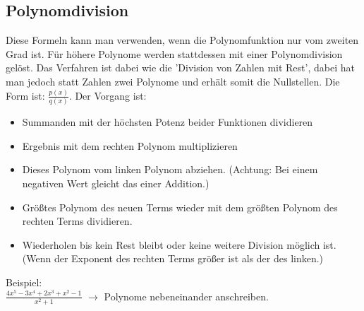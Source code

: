 \documentclass{article}
\begin{document}
	\subsection{Polynomdivision}
	Diese Formeln kann man verwenden, wenn die Polynomfunktion nur vom zweiten Grad ist. Für höhere Polynome werden stattdessen mit einer Polynomdivision gelöst. Das Verfahren ist dabei wie die 'Division von Zahlen mit Rest', dabei hat man jedoch statt Zahlen zwei Polynome und erhält somit die Nullstellen. Die Form ist: $\frac{p(x)}{q(x)}$. Der Vorgang ist:
	\begin{itemize}
		\item{Summanden mit der höchsten Potenz beider Funktionen dividieren}
		\item{Ergebnis mit dem rechten Polynom multiplizieren}
		\item{Dieses Polynom vom linken Polynom abziehen. (Achtung: Bei einem negativen Wert gleicht das einer Addition.)}
		\item{Größtes Polynom des neuen Terms wieder mit dem größten Polynom des rechten Terms dividieren.}
		\item{Wiederholen bis kein Rest bleibt oder keine weitere Division möglich ist. (Wenn der Exponent des rechten Terms größer ist als der des linken.)}
	\end{itemize}
	\newpage
	Beispiel: \\
	$\frac{4x^5-3x^4+2x^3+x^2-1}{x^2+1}$ $\to$ Polynome nebeneinander anschreiben. \\
\end{document}
